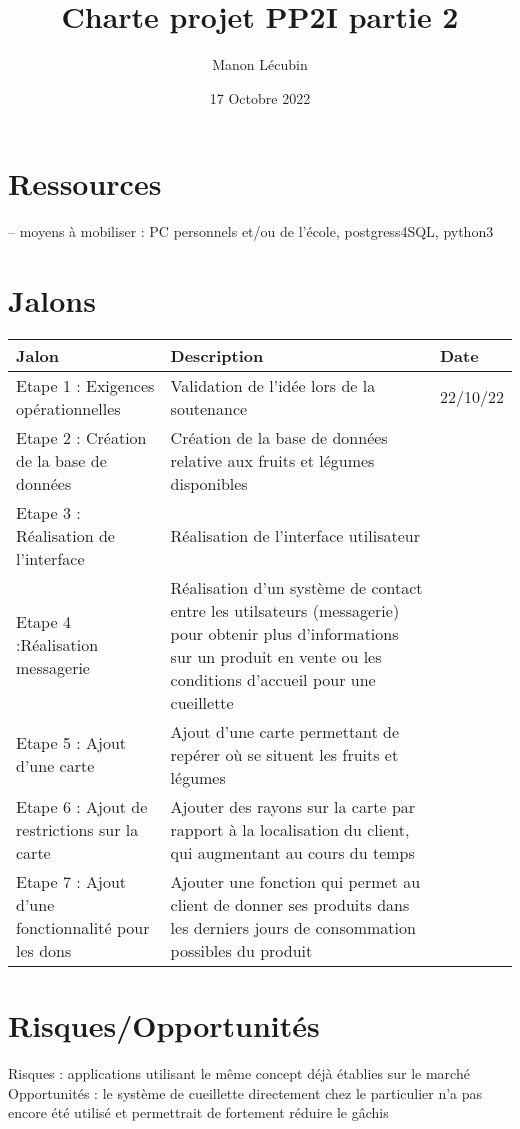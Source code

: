\documentclass{article}
\title{Charte projet PP2I partie 2}
\author{Manon Lécubin}
\date{17 Octobre 2022}
\begin{document}
\maketitle

\section{Ressources}
-- moyens à mobiliser :
PC personnels et/ou de l'école, postgress4SQL, python3 

\section{Jalons}
\centering
\begin{tabular}{|p{3cm}|p{5cm}|p{2cm}|} 
  \hline
  Jalon & Description & Date \\
  \hline
  Etape 1 : Exigences opérationnelles & Validation de l'idée lors de la soutenance & 22/10/22 \\
  \hline
  Etape 2 : Création de la base de données & Création de la base de données relative aux fruits et légumes disponibles &  \\
  \hline
  Etape 3 : Réalisation de l'interface & Réalisation de l'interface utilisateur & \\
  \hline
  Etape 4 :Réalisation messagerie & 
  Réalisation d'un système de contact entre les utilsateurs (messagerie) pour obtenir plus d'informations sur un produit en vente ou les conditions d'accueil pour une cueillette & \\
  \hline
  Etape 5 : Ajout d'une carte & Ajout d'une carte permettant de repérer où se situent les fruits et légumes & \\
  \hline
  Etape 6 : Ajout de restrictions sur la carte & Ajouter des rayons sur la carte par rapport à la localisation du client, qui augmentant au cours du temps & \\
  \hline
  Etape 7 : Ajout d'une fonctionnalité pour les dons & Ajouter une fonction qui permet au client de donner ses produits dans les derniers jours de consommation possibles du produit & \\ 
  \hline
\end{tabular}

\section{Risques/Opportunités}
Risques : applications utilisant le même concept déjà établies sur le marché
Opportunités : le système de cueillette directement chez le particulier n'a pas encore été utilisé et permettrait de fortement réduire le gâchis
\end{document}
